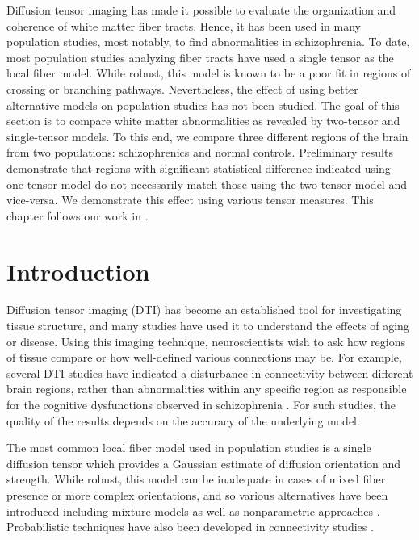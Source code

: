 \documentclass[final,hyperref]{gatech-thesis}
\newcommand{\citet}[1]{\cite{#1}} %
\begin{document}
Diffusion tensor imaging has made it possible to evaluate the organization and
coherence of white matter fiber tracts.  Hence, it has been used in many
population studies, most notably, to find abnormalities in schizophrenia.  To
date, most population studies analyzing fiber tracts have used a single tensor
as the local fiber model.  While robust, this model is known to be a poor fit
in regions of crossing or branching pathways.  Nevertheless, the effect of
using better alternative models on population studies has not been studied.
%
The goal of this section is to compare white matter abnormalities as revealed
by two-tensor and single-tensor models.  To this end, we compare three
different regions of the brain from two populations: schizophrenics and normal
controls.  Preliminary results demonstrate that regions with significant
statistical difference indicated using one-tensor model do not necessarily
match those using the two-tensor model and vice-versa.  We demonstrate this
effect using various tensor measures.  This chapter follows our work in
\citet{Malcolm2009study}.


\section{Introduction}

Diffusion tensor imaging (DTI) has become an established tool for
investigating tissue structure, and many studies have used it to understand
the effects of aging or disease.  Using this imaging technique,
neuroscientists wish to ask how regions of tissue compare or how well-defined
various connections may be.
%
For example, several DTI studies have indicated a disturbance in connectivity
between different brain regions, rather than abnormalities within any specific
region as responsible for the cognitive dysfunctions observed in schizophrenia
\cite{Kubicki2007}.  For such studies, the quality of the results depends on
the accuracy of the underlying model.

The most common local fiber model used in population studies is a single
diffusion tensor which provides a Gaussian estimate of diffusion orientation
and strength.  While robust, this model can be inadequate in cases of mixed
fiber presence or more complex orientations, and so various alternatives have
been introduced including mixture models
\cite{Alexander2001,Tuch2002,Peled2006,Hall2008} as well as nonparametric
approaches \cite{Tuch2002,Descoteaux2007,Jansons2003,Tournier2004,Jian2007ni}.
Probabilistic techniques have also been developed in connectivity studies
\cite{Parker2003,Behrens2007}.
\end{document}
